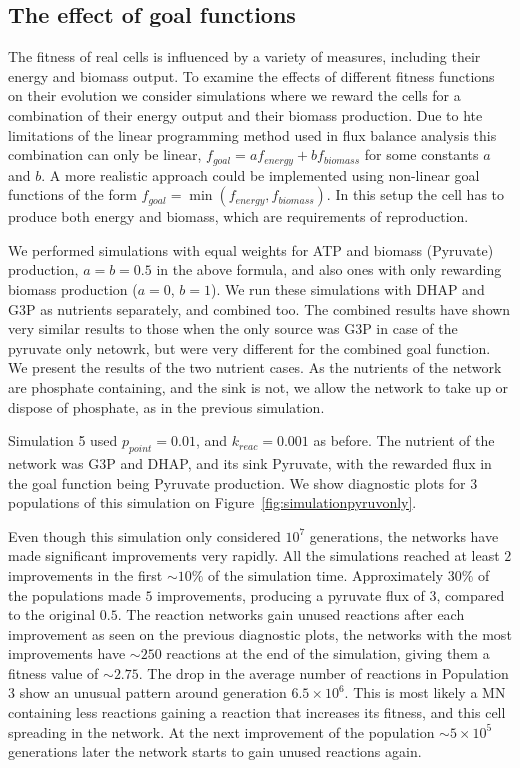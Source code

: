 \documentclass[a4paper,12pt]{article}
\begin{document}
\subsection{The effect of goal functions}
\label{sub:goalfuncs}

The fitness of real cells is influenced by a variety of measures, including their energy and biomass output. To examine the effects of different fitness functions on their evolution we consider simulations where we reward the cells for a combination of their energy output and their biomass production. Due to hte limitations of the linear programming method used in flux balance analysis this combination can only be linear, $f_{goal}=a f_{energy}+ b f_{biomass}$ for some constants $a$ and $b$. A more realistic approach could be implemented using non-linear goal functions of the form $f_{goal}=\min \left( f_{energy},f_{biomass} \right)$. In this setup the cell has to produce both energy and biomass, which are requirements of reproduction.

We performed simulations with equal weights for ATP and biomass (Pyruvate) production, $a=b=0.5$ in the above formula, and also ones with only rewarding biomass production ($a=0$, $b=1$). We run these simulations with DHAP and G3P as nutrients separately, and combined too. The combined results have shown very similar results to those when the only source was G3P in case of the pyruvate only netowrk, but were very different for the combined goal function. We present the results of the two nutrient cases. As the nutrients of the network are phosphate containing, and the sink is not, we allow the network to take up or dispose of phosphate, as in the previous simulation. 

Simulation 5 used $p_{point}=0.01$, and $k_{reac}=0.001$ as before. The nutrient of the network was G3P and DHAP, and its sink Pyruvate, with the rewarded flux in the goal function being Pyruvate production. We show diagnostic plots for $3$ populations of this simulation on Figure~\ref{fig:simulationpyruvonly}.

Even though this simulation only considered $10^7$ generations, the networks have made significant improvements very rapidly. All the simulations reached at least $2$ improvements in the first $\sim 10\%$ of the simulation time. Approximately $30\%$ of the populations made $5$ improvements, producing a pyruvate flux of $3$, compared to the original $0.5$. The reaction networks gain unused reactions after each improvement as seen on the previous diagnostic plots, the networks with the most improvements have $\sim 250$ reactions at the end of the simulation, giving them a fitness value of $\sim 2.75$. The drop in the average number of reactions in Population 3 show an unusual pattern around generation $6.5\times 10^6$. This is most likely a MN containing less reactions gaining a reaction that increases its fitness, and this cell spreading in the network. At the next improvement of the population $\sim 5\times10^5$ generations later the network starts to gain unused reactions again. 
\end{document}
